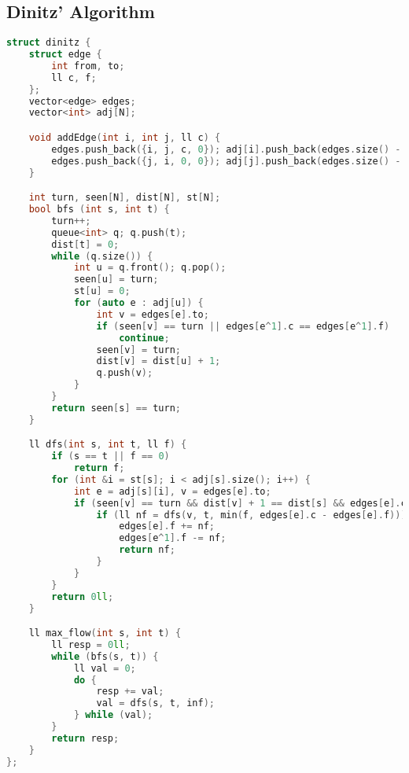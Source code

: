 \documentclass{article}
\begin{document}
\subsection{Dinitz' Algorithm}
\begin{lstlisting}[language=C++]
struct dinitz {
	struct edge {
		int from, to;
		ll c, f;
	};
	vector<edge> edges;
	vector<int> adj[N];

	void addEdge(int i, int j, ll c) {
		edges.push_back({i, j, c, 0}); adj[i].push_back(edges.size() - 1);
		edges.push_back({j, i, 0, 0}); adj[j].push_back(edges.size() - 1);
	}

	int turn, seen[N], dist[N], st[N];
	bool bfs (int s, int t) {
		turn++;
		queue<int> q; q.push(t);
		dist[t] = 0; 
		while (q.size()) {
			int u = q.front(); q.pop();
			seen[u] = turn;
			st[u] = 0;
			for (auto e : adj[u]) {
				int v = edges[e].to;
				if (seen[v] == turn || edges[e^1].c == edges[e^1].f)
					continue;
				seen[v] = turn;
				dist[v] = dist[u] + 1;
				q.push(v);
			}
		}
		return seen[s] == turn;
	}

	ll dfs(int s, int t, ll f) {
		if (s == t || f == 0)
			return f;
		for (int &i = st[s]; i < adj[s].size(); i++) {
			int e = adj[s][i], v = edges[e].to;
			if (seen[v] == turn && dist[v] + 1 == dist[s] && edges[e].c > edges[e].f) {
				if (ll nf = dfs(v, t, min(f, edges[e].c - edges[e].f))) {
					edges[e].f += nf;
					edges[e^1].f -= nf;
					return nf;
				}
			}
		}
		return 0ll;
	}

	ll max_flow(int s, int t) {
		ll resp = 0ll;
		while (bfs(s, t)) {
			ll val = 0;
			do {
				resp += val;
				val = dfs(s, t, inf);
			} while (val);
		}
		return resp;
	}
};
\end{lstlisting}
\end{document}

